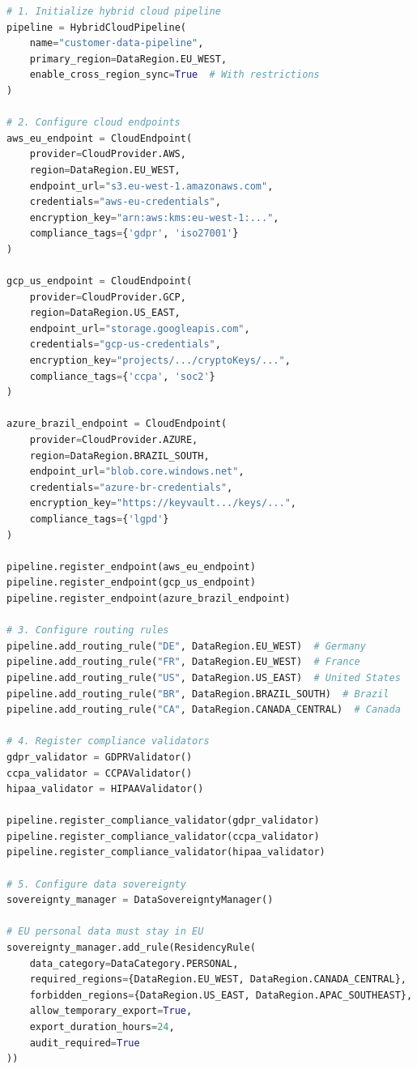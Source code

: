 \begin{lstlisting}[language=Python, caption={Complete GDPR-Compliant Hybrid Cloud Pipeline}]
# 1. Initialize hybrid cloud pipeline
pipeline = HybridCloudPipeline(
    name="customer-data-pipeline",
    primary_region=DataRegion.EU_WEST,
    enable_cross_region_sync=True  # With restrictions
)

# 2. Configure cloud endpoints
aws_eu_endpoint = CloudEndpoint(
    provider=CloudProvider.AWS,
    region=DataRegion.EU_WEST,
    endpoint_url="s3.eu-west-1.amazonaws.com",
    credentials="aws-eu-credentials",
    encryption_key="arn:aws:kms:eu-west-1:...",
    compliance_tags={'gdpr', 'iso27001'}
)

gcp_us_endpoint = CloudEndpoint(
    provider=CloudProvider.GCP,
    region=DataRegion.US_EAST,
    endpoint_url="storage.googleapis.com",
    credentials="gcp-us-credentials",
    encryption_key="projects/.../cryptoKeys/...",
    compliance_tags={'ccpa', 'soc2'}
)

azure_brazil_endpoint = CloudEndpoint(
    provider=CloudProvider.AZURE,
    region=DataRegion.BRAZIL_SOUTH,
    endpoint_url="blob.core.windows.net",
    credentials="azure-br-credentials",
    encryption_key="https://keyvault.../keys/...",
    compliance_tags={'lgpd'}
)

pipeline.register_endpoint(aws_eu_endpoint)
pipeline.register_endpoint(gcp_us_endpoint)
pipeline.register_endpoint(azure_brazil_endpoint)

# 3. Configure routing rules
pipeline.add_routing_rule("DE", DataRegion.EU_WEST)  # Germany
pipeline.add_routing_rule("FR", DataRegion.EU_WEST)  # France
pipeline.add_routing_rule("US", DataRegion.US_EAST)  # United States
pipeline.add_routing_rule("BR", DataRegion.BRAZIL_SOUTH)  # Brazil
pipeline.add_routing_rule("CA", DataRegion.CANADA_CENTRAL)  # Canada

# 4. Register compliance validators
gdpr_validator = GDPRValidator()
ccpa_validator = CCPAValidator()
hipaa_validator = HIPAAValidator()

pipeline.register_compliance_validator(gdpr_validator)
pipeline.register_compliance_validator(ccpa_validator)
pipeline.register_compliance_validator(hipaa_validator)

# 5. Configure data sovereignty
sovereignty_manager = DataSovereigntyManager()

# EU personal data must stay in EU
sovereignty_manager.add_rule(ResidencyRule(
    data_category=DataCategory.PERSONAL,
    required_regions={DataRegion.EU_WEST, DataRegion.CANADA_CENTRAL},
    forbidden_regions={DataRegion.US_EAST, DataRegion.APAC_SOUTHEAST},
    allow_temporary_export=True,
    export_duration_hours=24,
    audit_required=True
))


\end{lstlisting}
